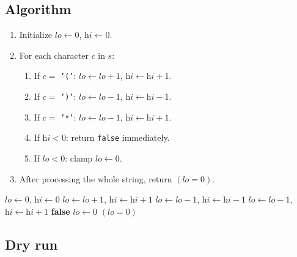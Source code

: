 \subsection*{Algorithm}

\begin{enumerate}
  \item Initialize $\textit{lo} \gets 0$, $\textit{hi} \gets 0$.
  \item For each character $c$ in $s$:
  \begin{enumerate}
    \item If $c = $ \texttt{'('}: $\textit{lo} \gets \textit{lo}+1$,
          $\textit{hi} \gets \textit{hi}+1$.
    \item If $c = $ \texttt{')'}: $\textit{lo} \gets \textit{lo}-1$,
          $\textit{hi} \gets \textit{hi}-1$.
    \item If $c = $ \texttt{'*'}: $\textit{lo} \gets \textit{lo}-1$,
          $\textit{hi} \gets \textit{hi}+1$.
    \item If $\textit{hi} < 0$: return \texttt{false} immediately.
    \item If $\textit{lo} < 0$: clamp $\textit{lo} \gets 0$.
  \end{enumerate}
  \item After processing the whole string, return
        $(\textit{lo} = 0)$.
\end{enumerate}

\begin{algorithm}[H]
\caption{Valid Parenthesis String}
\begin{algorithmic}[1]
  \State $\textit{lo} \gets 0$, $\textit{hi} \gets 0$
      \State $\textit{lo} \gets \textit{lo} + 1$, $\textit{hi} \gets \textit{hi} + 1$
      \State $\textit{lo} \gets \textit{lo} - 1$, $\textit{hi} \gets \textit{hi} - 1$
    \Else {}
      \State $\textit{lo} \gets \textit{lo} - 1$, $\textit{hi} \gets \textit{hi} + 1$
    \EndIf
      \State \Return \textbf{false}
    \EndIf
      \State $\textit{lo} \gets 0$
    \EndIf
  \EndFor
  \State \Return $(\textit{lo} = 0)$
\EndProcedure
\end{algorithmic}
\end{algorithm}

\subsection*{Dry run}

